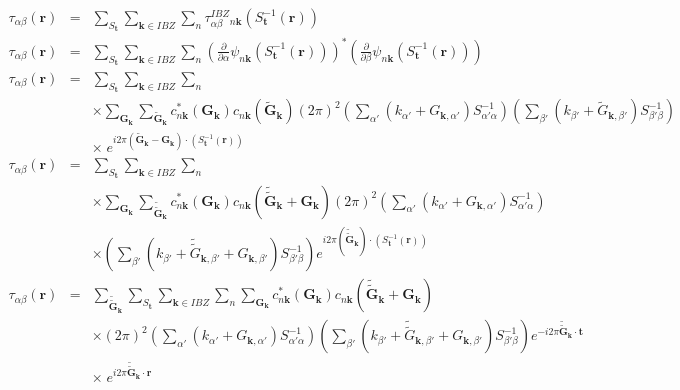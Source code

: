 \documentclass[a4paper,12pt]{report}
\begin{document}
\begin{eqnarray}
\tau_{\alpha\beta}(\mathbf{r}) &=& \sum_{S_{\mathbf{t}}} \sum_{\mathbf{k} \in IBZ} \sum_n \tau_{\alpha\beta}^{IBZ}_{n\mathbf{k}} (S_{\mathbf{t}}^{-1} (\mathbf{r})) \nonumber\\
\tau_{\alpha\beta}(\mathbf{r}) &=& \sum_{S_{\mathbf{t}}} \sum_{\mathbf{k} \in IBZ} \sum_n  \left( \frac{\partial}{\partial \alpha} \psi_{n\mathbf{k}} (S_{\mathbf{t}}^{-1} (\mathbf{r})) \right)^{*}\left( \frac{\partial}{\partial \beta} \psi_{n\mathbf{k}} (S_{\mathbf{t}}^{-1} (\mathbf{r})) \right)   \nonumber\\
\tau_{\alpha\beta}(\mathbf{r}) &=& \sum_{S_{\mathbf{t}}} \sum_{\mathbf{k} \in IBZ} \sum_n \nonumber \\
&&\times \sum_{\mathbf{G}_{\mathbf{k}}} \sum_{\tilde{\mathbf{G}}_{\mathbf{k}}} c_{n\mathbf{k}}^{*}(\mathbf{G}_{\mathbf{k}}) c_{n\mathbf{k}}(\tilde{\mathbf{G}}_{\mathbf{k}}) (2\pi)^2 \left(\sum_{\alpha'}\left( k_{\alpha'} + G_{\mathbf{k},\alpha'}\right) S_{\alpha'\alpha}^{-1} \right) \left(\sum_{\beta'}\left( k_{\beta'} + \tilde{G}_{\mathbf{k},\beta'}\right) S_{\beta'\beta}^{-1} \right) \nonumber \\
&&\times\; e^{i2\pi \left(\tilde{\mathbf{G}}_{\mathbf{k}} -\mathbf{G}_{\mathbf{k}}\right) \cdotp \left( S_{\mathbf{t}}^{-1} (\mathbf{r}) \right)  } \nonumber\\
\tau_{\alpha\beta}(\mathbf{r}) &=& \sum_{S_{\mathbf{t}}} \sum_{\mathbf{k} \in IBZ} \sum_n \nonumber \\
&&\times \sum_{\mathbf{G}_{\mathbf{k}}} \sum_{\tilde{\tilde{\mathbf{G}}}_{\mathbf{k}}} c_{n\mathbf{k}}^{*}(\mathbf{G}_{\mathbf{k}}) c_{n\mathbf{k}}(\tilde{\tilde{\mathbf{G}}}_{\mathbf{k}}+\mathbf{G}_{\mathbf{k}}) (2\pi)^2 \left(\sum_{\alpha'}\left( k_{\alpha'} + G_{\mathbf{k},\alpha'}\right) S_{\alpha'\alpha}^{-1} \right) \nonumber \\
&&\times \left(\sum_{\beta'}\left( k_{\beta'} + \tilde{\tilde{G}}_{\mathbf{k},\beta'} + G_{\mathbf{k},\beta'}\right) S_{\beta'\beta}^{-1} \right) e^{i2\pi \left(\tilde{\tilde{\mathbf{G}}}_{\mathbf{k}}\right) \cdotp \left( S_{\mathbf{t}}^{-1} (\mathbf{r}) \right)  } \nonumber\\
\tau_{\alpha\beta}(\mathbf{r}) &=& \sum_{\tilde{\tilde{\mathbf{G}}}_{\mathbf{k}}} \sum_{S_{\mathbf{t}}} \sum_{\mathbf{k} \in IBZ} \sum_n \sum_{\mathbf{G}_{\mathbf{k}}} c_{n\mathbf{k}}^{*}(\mathbf{G}_{\mathbf{k}}) c_{n\mathbf{k}}(\tilde{\tilde{\mathbf{G}}}_{\mathbf{k}}+\mathbf{G}_{\mathbf{k}})  \nonumber \\
&&\times  (2\pi)^2 \left(\sum_{\alpha'}\left( k_{\alpha'} + G_{\mathbf{k},\alpha'}\right) S_{\alpha'\alpha}^{-1} \right) \left(\sum_{\beta'}\left( k_{\beta'} + \tilde{\tilde{G}}_{\mathbf{k},\beta'} + G_{\mathbf{k},\beta'}\right) S_{\beta'\beta}^{-1} \right) e^{-i2\pi \tilde{\tilde{\mathbf{G}}}_{\mathbf{k}} \cdotp \mathbf{t}} \nonumber \\
&&\times\;  e^{i2\pi \tilde{\tilde{\mathbf{G}}}_{\mathbf{k}} \cdotp \mathbf{r}  }
\end{eqnarray}
\end{document}
